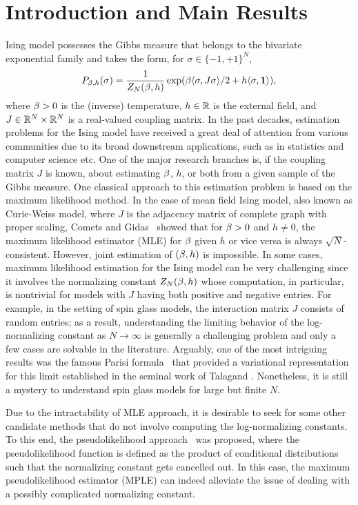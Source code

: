 \documentclass[letterpaper,11pt,reqno]{amsart}
\newcommand{\ra}{\rangle}
\newcommand{\la}{\langle}
\newcommand{\mv}[1]{\boldsymbol{#1}}\newcommand{\mvinfty}{\boldsymbol{\infty}}\newcommand{\mvzero}{\boldsymbol{0}}
\newcommand{\mvgs}{{\sigma}}
\begin{document}
\section{Introduction and Main Results}


Ising model possesses the Gibbs measure that belongs to the bivariate exponential family and takes the form, for $\mvgs\in \{-1,+1\}^N$, 
\[
P_{\gb,h}(\mvgs) =  \frac{1}{Z_N(\beta,h)}\exp(\gb  \la\mvgs, J\mvgs \ra/2 +h \la \mvgs, \mv1 \ra ),
\]
where $\beta>0$ is the (inverse) temperature, $h\in \mathbb{R}$ is the external field, and $J\in \mathbb{R}^N\times \mathbb{R}^N$ is a real-valued coupling matrix. In the past decades, estimation problems for the Ising model have received a great deal of attention from various communities due to its broad downstream applications, such as in statistics and computer science etc. One of the major research branches is, if the coupling matrix $J$ is known, about estimating $\beta$, $h$, or both from a given sample of the Gibbs measure. One classical approach to this estimation problem is based on the maximum likelihood method. In the case of mean field Ising model, also known as Curie-Weiss model, where $J$ is the adjacency matrix of complete graph with proper scaling, Comets and Gidas~\cite{CG91} showed that for $\beta>0$ and $h\neq 0$, the maximum likelihood estimator (MLE) for $\beta$ given $h$ or vice versa is always $\sqrt{N}$-consistent. However, joint estimation of $(\beta,h)$ is impossible. In some cases, maximum likelihood estimation for the Ising model can be very challenging since it involves the normalizing constant $Z_N(\beta,h)$ whose computation, in particular, is nontrivial for models with $J$ having both positive and negative entries. For example, in the setting of spin glass models, the interaction matrix $J$ consists of random entries; as a result, understanding the limiting behavior of the log-normalizing constant as $N\to \infty$ is generally a challenging problem and only a few cases are solvable in the literature. Arguably, one of the most intriguing results was the famous Parisi formula~\cite{Par79,Par80} that provided a variational representation for this limit established in the seminal work of Talagand \cite{Tal06}. Nonetheless, it is still a mystery to understand spin glass models for large but finite $N$. 




Due to the intractability of MLE approach, it is desirable to seek for some other candidate methods that do not involve computing the log-normalizing constants. To this end, the pseudolikelihood approach~\cite{Bes74,Bes75} was proposed, where the pseudolikelihood function is defined as the product of conditional distributions such that the normalizing constant gets cancelled out. In this case, the maximum pseudolikelihood estimator (MPLE) can indeed alleviate the issue of dealing with a possibly complicated normalizing constant.  
\end{document}
